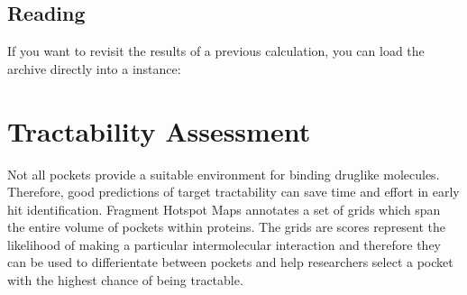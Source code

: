 \documentclass[letterpaper,10pt,english]{sphinxmanual}
\begin{document}
\begin{sphinxVerbatim}[commandchars=\\\{\}]
   

  

     
\end{sphinxVerbatim}


\subsection{Reading}
\label{\detokenize{tutorial:reading}}
If you want to revisit the results of a previous calculation, you can load the  archive directly into a
 instance:

\begin{sphinxVerbatim}[commandchars=\\\{\}]
   

  
\end{sphinxVerbatim}


\section{Tractability Assessment}
\label{\detokenize{tutorial:tractability-assessment}}
Not all pockets provide a suitable environment for binding drug\sphinxhyphen{}like molecules. Therefore, good predictions
of target tractability can save time and effort in early hit identification. Fragment Hotspot Maps annotates a
set of grids which span the entire volume of pockets within proteins. The grids are scores represent the
likelihood of making a particular intermolecular interaction and therefore they can be used to differientate
between pockets and help researchers select a pocket with the highest chance of being tractable.
\end{document}
